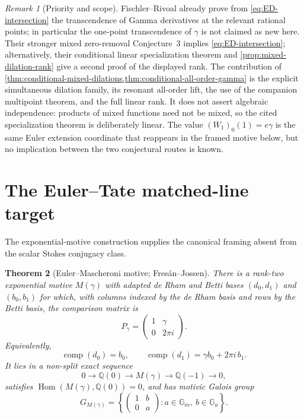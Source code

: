 \documentclass[11pt]{article}
\newtheorem{theorem}{Theorem}[section]
\theoremstyle{definition}
\theoremstyle{remark}
\newtheorem{remark}[theorem]{Remark}
\newcommand{\Q}{\mathbb Q}
\begin{document}
\begin{remark}[Priority and scope]
Fischler--Rivoal already prove from \eqref{eq:ED-intersection} the
transcendence of Gamma derivatives at the relevant rational points; in
particular the one-point transcendence of \(\gamma\) is not claimed as new
here.  Their stronger mixed zero-removal Conjecture~3 implies
\eqref{eq:ED-intersection}; alternatively, their conditional linear
specialization theorem and \cref{prop:mixed-dilation-rank} give a second
proof of the displayed rank.  The contribution of
\cref{thm:conditional-mixed-dilations,thm:conditional-all-order-gamma} is
the explicit simultaneous dilation family, its resonant all-order lift, the
use of the companion multipoint theorem, and the full linear rank.  It
does not assert algebraic independence: products of mixed functions need
not be mixed, so the cited specialization theorem is deliberately linear.
The value \((W_1)_0(1)=e\gamma\) is the same Euler extension coordinate
that reappears in the framed motive below, but no implication between the
two conjectural routes is known.
\end{remark}

\section{The Euler--Tate matched-line target}
\label{sec:euler-tate}

The exponential-motive construction supplies the canonical framing absent
from the scalar Stokes conjugacy class.

\begin{theorem}[Euler--Mascheroni motive; Fres\'an--Jossen]
\label{thm:FJ-euler-motive}
There is a rank-two exponential motive \(M(\gamma)\) with adapted de Rham
and Betti bases \((d_0,d_1)\) and \((b_0,b_1)\) for which, with columns
indexed by the de Rham basis and rows by the Betti basis, the comparison
matrix is
\begin{equation}\label{eq:euler-period-matrix}
 P_\gamma=\begin{pmatrix}1&\gamma\\0&2\pi i\end{pmatrix}.
\end{equation}
Equivalently,
\[
 \operatorname{comp}(d_0)=b_0,
 \qquad
 \operatorname{comp}(d_1)=\gamma b_0+2\pi i\,b_1.
\]
It lies in a non-split exact sequence
\begin{equation}\label{eq:euler-motive-extension}
 0\longrightarrow\Q(0)\longrightarrow M(\gamma)
 \longrightarrow\Q(-1)\longrightarrow0,
\end{equation}
satisfies \(\operatorname{Hom}(M(\gamma),\Q(0))=0\), and has motivic
Galois group
\[
 G_{M(\gamma)}=
 \left\{\begin{pmatrix}1&b\\0&a\end{pmatrix}:
 a\in\mathbb G_m,\ b\in\mathbb G_a\right\}.
\]
\end{theorem}
\end{document}
